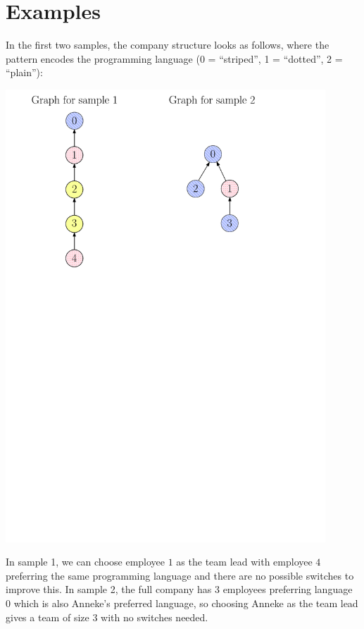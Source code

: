 \section*{Examples}
In the first two samples, the company structure looks as follows, where the pattern encodes the programming language (0 = ``striped'', 1 = ``dotted'', 2 = ``plain''):

\includegraphics[width=0.9\textwidth]{kattis_e1e2}

In sample 1, we can choose employee $1$ as the team lead with employee $4$ preferring the same programming language and there are no possible switches to improve this.
In sample 2, the full company has $3$ employees preferring language $0$ which is also Anneke's preferred language, so choosing Anneke as the team lead gives a team of size $3$ with no switches needed.

